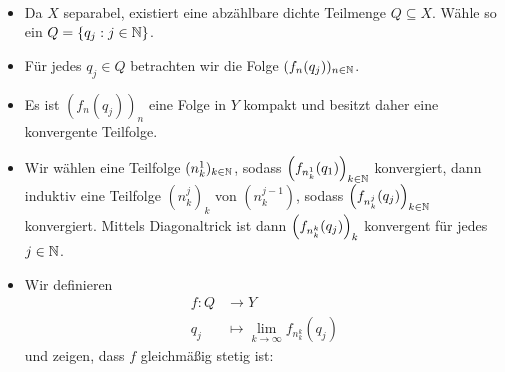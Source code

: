 \begin{beweis}
	\mbox{} \\[-.9cm]
	\begin{itemize}
		\item Da $X$ separabel, existiert eine abzählbare dichte Teilmenge $Q \subseteq X$.
		Wähle so ein $Q = \{q_j : j \in \NN\}$.
		\item Für jedes $q_j \in Q$ betrachten wir die Folge $(f_n(q_j))_{n \in \NN}$.
		\item Es ist $(f_n(q_j))_n$ eine Folge in $Y$ kompakt und besitzt daher eine konvergente Teilfolge.
		\item Wir wählen eine Teilfolge $(n_k^1)_{k \in \NN}$, sodass $\enbrace*{f_{n_k^1}(q_1)}_{k \in \NN}$ konvergiert, dann induktiv eine Teilfolge $(n_k^j)_k$ von $(n_k^{j-1})$, sodass $\enbrace*{f_{n_k^j}(q_j)}_{k \in \NN}$ konvergiert.
		Mittels Diagonaltrick ist dann $\enbrace*{f_{n_k^k}(q_j)}_k$ konvergent für jedes $j \in \NN$.
		\item Wir definieren 
		\begin{align*}
			f \colon Q &\longrightarrow Y \\
			q_j &\longmapsto \lim\limits_{k \rightarrow \infty} f_{n_k^k}(q_j)
		\end{align*}
		und zeigen, dass $f$ gleichmäßig stetig ist:
		

\end{itemize}
\end{beweis}
